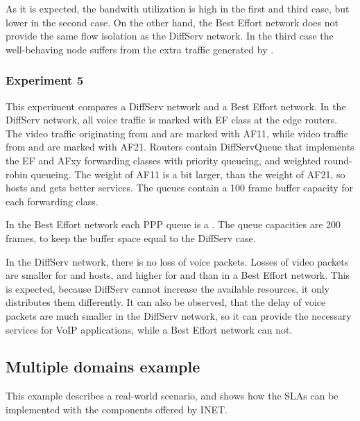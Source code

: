 As it is expected, the bandwith utilization is high in the first
and third case, but lower in the second case. On the other hand,
the Best Effort network does not provide the same flow isolation
as the DiffServ network. In the third case the well-behaving
 node suffers from the extra traffic generated by .

\subsubsection*{Experiment 5}

This experiment compares a DiffServ network and a Best Effort network.
In the DiffServ network, all voice traffic is marked with EF class
at the edge routers. The video traffic originating from  and
 are marked with AF11, while video traffic from  and
 are marked with AF21. Routers contain DiffServQueue that
implements the EF and AFxy forwarding classes with priority queueing,
and weighted round-robin queueing. The weight of AF11 is a bit larger,
than the weight of AF21, so hosts  and  gets better
services. The queues contain a 100 frame buffer capacity for each forwarding
class.

In the Best Effort network each PPP queue is a .
The queue capacities are 200 frames, to keep the buffer space equal to
the DiffServ case.

In the DiffServ network, there is no loss of voice packets. Losses
of video packets are smaller for  and  hosts, and
higher for  and  than in a Best Effort network.
This is expected, because DiffServ cannot increase the available
resources, it only distributes them differently. It can also be
observed, that the delay of voice packets are much smaller in the
DiffServ network, so it can provide the necessary services for
VoIP applications, while a Best Effort network can not.

\subsection*{Multiple domains example}

This example describes a real-world scenario, and shows how
the SLAs can be implemented with the components offered by INET.



